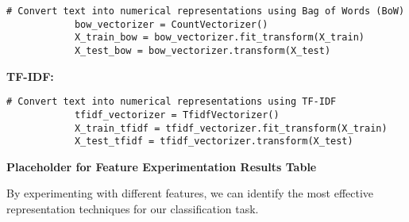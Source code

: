         \vspace{0.5em}

        \begin{lstlisting}[caption={Convert text using Bag of Words (BoW)}, label={lst:bow_conversion}]
            # Convert text into numerical representations using Bag of Words (BoW)
            bow_vectorizer = CountVectorizer()
            X_train_bow = bow_vectorizer.fit_transform(X_train)
            X_test_bow = bow_vectorizer.transform(X_test)
        \end{lstlisting}

        \textbf{TF-IDF:}
        
        \vspace{0.5em}

        \begin{lstlisting}[caption={Convert text using TF-IDF}, label={lst:tfidf_conversion}]
            # Convert text into numerical representations using TF-IDF
            tfidf_vectorizer = TfidfVectorizer()
            X_train_tfidf = tfidf_vectorizer.fit_transform(X_train)
            X_test_tfidf = tfidf_vectorizer.transform(X_test)
        \end{lstlisting}

        \textbf{Placeholder for Feature Experimentation Results Table}

        By experimenting with different features, we can identify the most effective representation techniques for our classification task.
